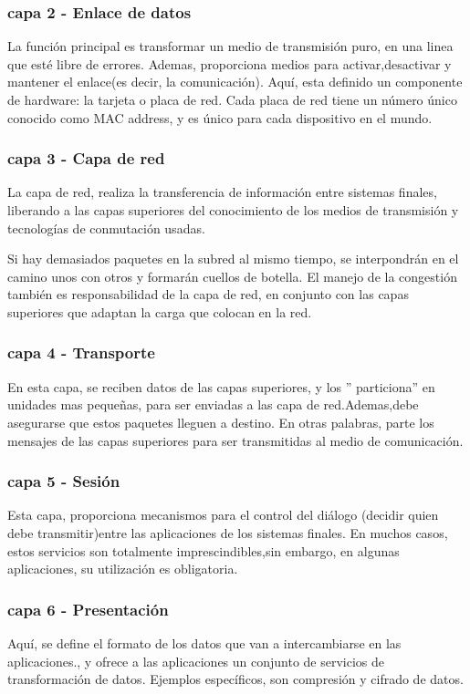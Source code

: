 \subsubsection{capa 2 - Enlace de datos } 
La función principal es transformar un medio de transmisión puro, en una linea que esté libre de errores. Ademas, proporciona medios para activar,desactivar y mantener el enlace(es decir, la comunicación). Aquí, esta definido un componente de hardware: la tarjeta o placa de red. Cada placa de red tiene un número único conocido como MAC address, y es único para cada dispositivo en el mundo. 

\subsubsection{capa 3 - Capa de red}
La capa de red, realiza la transferencia de información entre sistemas finales, liberando a las capas superiores del conocimiento de los medios de transmisión y tecnologías de conmutación usadas. 

Si hay demasiados paquetes en la subred al mismo tiempo, se interpondrán en el camino unos con
otros y formarán cuellos de botella. El manejo de la congestión también es responsabilidad de la capa de
red, en conjunto con las capas superiores que adaptan la carga que colocan en la red.
\subsubsection{capa 4 - Transporte }
En esta capa, se reciben datos de las capas superiores, y los '' particiona'' en unidades mas pequeñas, para ser enviadas a las capa de red.Ademas,debe asegurarse  que estos paquetes lleguen a destino. En otras palabras, parte los mensajes de las capas superiores para ser transmitidas al medio de comunicación. 

\subsubsection{capa 5 - Sesión  }
Esta capa, proporciona mecanismos para el control del diálogo (decidir quien debe transmitir)entre las aplicaciones de los sistemas finales. En muchos casos, estos servicios son totalmente  imprescindibles,sin embargo, en algunas aplicaciones, su utilización es obligatoria. 

\subsubsection{capa 6 - Presentación}
Aquí, se define el formato de los datos que van a intercambiarse en las aplicaciones., y ofrece a las aplicaciones un conjunto de servicios de transformación de datos. Ejemplos específicos, son compresión y cifrado de datos. 


